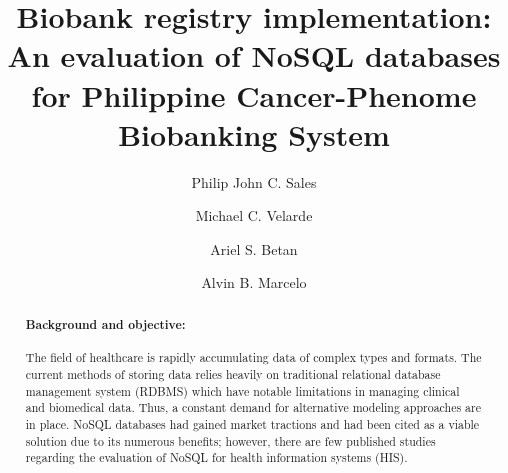\documentclass[5p]{elsarticle}
\begin{document}
\begin{frontmatter}

\title{Biobank registry implementation: An evaluation of NoSQL databases \\for Philippine Cancer-Phenome Biobanking System}


\author[miuaddress]{Philip John C. Sales}

\author[regenlabaddress]{Michael C. Velarde}

\author[miuaddress,casaddress]{Ariel S. Betan}


\author[miuaddress]{Alvin B. Marcelo}


\address[miuaddress]{Medical Informatics Unit, College of Medicine, University of the Philippines, Ermita, Metro Manila}
\address[regenlabaddress]{Regenerative Biology Research Laboratory, Institute of Biology, University of the Philippines, Quezon City, Diliman }
\address[casaddress]{College of Arts and Sciences, Department of Social Sciences, University of the Philippines, Ermita, Metro Manila}

\begin{abstract}

\paragraph{Background and objective:} The field of healthcare is rapidly accumulating data of complex types and formats. 
The current methods of storing data relies heavily on traditional relational database management system (RDBMS) which have notable limitations 
in managing clinical and biomedical data. Thus, a constant demand for alternative modeling approaches are in place. NoSQL databases had gained 
market tractions and had been cited as a viable solution due to its numerous benefits; however, there are few published studies regarding 
the evaluation of NoSQL for health information systems (HIS). 


\end{abstract}
\end{frontmatter}
\end{document}
